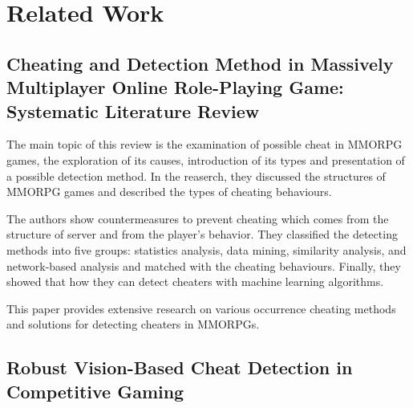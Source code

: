 \section{Related Work}
\label{ch:lit_rev}

\subsection{Cheating and Detection Method in Massively Multiplayer Online Role-Playing Game: Systematic Literature Review \cite{9766355}}

The main topic of this review is the examination of possible cheat in MMORPG games, the exploration of its causes, introduction of its types and presentation of a possible detection method.
In the reaserch, they discussed the structures of MMORPG games and described the types of cheating behaviours.

The authors show countermeasures to prevent cheating which comes from the structure of server and from the player's behavior.
They classified the detecting methods into five groups: statistics analysis, data mining, similarity analysis, and network-based analysis and matched with the cheating behaviours.
Finally, they showed that how they can detect cheaters with machine learning algorithms.

This paper provides extensive research on various occurrence cheating methods and solutions for detecting cheaters in MMORPGs.

\subsection{Robust Vision-Based Cheat Detection in Competitive Gaming \cite{jonnalagadda2021robust}}

